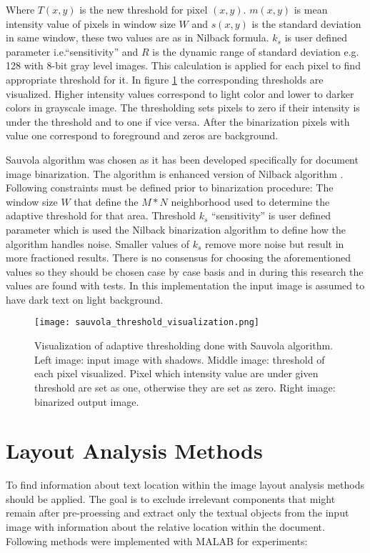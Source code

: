 \documentclass{article}
\begin{document}
          Where $T(x,y)$ is the new threshold for pixel $(x,y)$. $m(x,y)$ is mean intensity value of pixels in window size $W$ and $s(x,y)$ is the standard deviation in same window, these two values are as in Nilback formula. $k_s$ is user defined parameter i.e.``sensitivity'' and  $R$ is the dynamic range of standard deviation e.g. 128 with 8-bit gray level images. This calculation is applied for each pixel to find appropriate threshold for it. In figure \ref{fig:sauvolathresholdvis} the corresponding thresholds are visualized. Higher intensity values correspond to light color and lower to darker colors in grayscale image. The thresholding sets pixels to zero if their intensity is under the threshold and to one if vice versa. After the binarization pixels with value one correspond to foreground and zeros are background.

          Sauvola algorithm was chosen as it has been developed specifically for document image binarization. The algorithm is enhanced version of Nilback algorithm \cite{Sauvola2000}.  Following constraints must be defined prior to binarization procedure: The window size $W$ that define the $M * N$ neighborhood used to determine the adaptive threshold for that area. Threshold $k_s$ ``sensitivity'' is user defined parameter which is used the Nilback binarization algorithm to define how the algorithm handles noise. Smaller values of $k_s$ remove more noise but result in more fractioned results. There is no consensus for choosing the aforementioned values so they should be chosen case by case basis and in during this research the values are found with tests. In this implementation the input image is assumed to have dark text on light background.

          \begin{figure}[!ht]
            \centering
            \texttt{[image: sauvola\_threshold\_visualization.png]}
            \caption{Visualization of adaptive thresholding done with Sauvola algorithm. Left image: input image with shadows. Middle image: threshold of each pixel visualized. Pixel which intensity value are under given threshold are set as one, otherwise they are set as zero. Right image: binarized output image. \label{fig:sauvolathresholdvis} }
          \end{figure}

    \newpage
    \section{Layout Analysis Methods}
      To find information about text location within the image layout analysis methods should be applied. The goal is to exclude irrelevant components that might remain after pre-proessing and extract only the textual objects from the input image with information about the relative location within the document. Following methods were implemented with MALAB for experiments:
\end{document}
